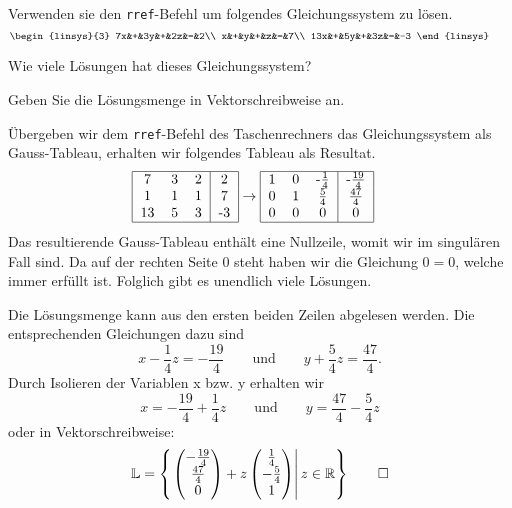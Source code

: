 Verwenden sie den \texttt{rref}-Befehl um folgendes Gleichungssystem zu lösen.
\[
\begin{linsys}{3}
7x&+&3y&+&2z&=&2\\
x&+&y&+&z&=&7\\
13x&+&5y&+&3z&=&-3
\end{linsys}
\qquad
\]
\begin{teilaufgaben}
\item
Wie viele Lösungen hat dieses Gleichungssystem?
\item
Geben Sie die Lösungsmenge in Vektorschreibweise an.
\end{teilaufgaben}
\begin{loesung}
\begin{teilaufgaben}
\item
Übergeben wir dem \texttt{rref}-Befehl des Taschenrechners das Gleichungssystem
als Gauss-Tableau, erhalten wir folgendes Tableau als Resultat.
\begin{align*}
\begin{tabular}{|ccc|c|}
\hline
7&3&2&2\\
1&1&1&7\\
13&5&3&-3\\
\hline
\end{tabular}
&
\rightarrow
\begin{tabular}{|ccc|c|}
\hline
1&0&-$\frac{1}{4}$&-$\frac{19}{4}$\\
0&1&$\frac{5}{4}$&$\frac{47}{4}$\\
0&0&0&0\\
\hline
\end{tabular}
\end{align*}
Das resultierende Gauss-Tableau enthält eine Nullzeile, womit wir im singulären Fall sind.
Da auf der rechten Seite 0 steht haben wir die Gleichung $0=0$, welche immer erfüllt ist.
Folglich gibt es unendlich viele Lösungen. 
\item
Die Lösungsmenge kann aus den ersten beiden
Zeilen abgelesen werden. Die entsprechenden Gleichungen dazu sind
\[
x-\frac{1}{4}z = -\frac{19}{4}\qquad\text{und}\qquad y+\frac{5}{4}z = \frac{47}{4}.
\]
Durch Isolieren der Variablen x bzw. y erhalten wir
\[
x = -\frac{19}{4} +\frac{1}{4}z\qquad\text{und}\qquad y = \frac{47}{4} -\frac{5}{4}z
\]
oder in Vektorschreibweise:
\[
\mathbb L =\left\{\left.
 \begin{pmatrix}
-\frac{19}{4}\\\frac{47}{4}\\0
\end{pmatrix}
+z\begin{pmatrix}
\frac{1}{4}\\-\frac{5}{4}\\1
\end{pmatrix}\right | z\in \mathbb R
\right\}
\qedhere
\]
\end{teilaufgaben}
\end{loesung}

